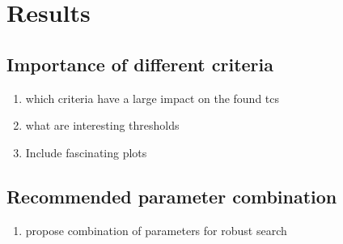 \chapter{Results}\label{sec:results}
\section{Importance of different criteria}
\begin{enumerate}
    \item which criteria have a large impact on the found tcs
    \item what are interesting thresholds
    \item Include fascinating plots
\end{enumerate}
\section{Recommended parameter combination}
\begin{enumerate}
    \item propose combination of parameters for robust search
\end{enumerate}